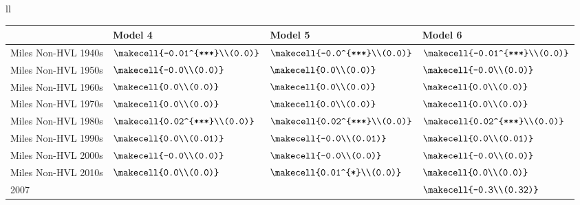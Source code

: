 \begin{tabular}{ll}
\begin{tabular}{llll}
\toprule
{} &                           Model 4 &                          Model 5 &                           Model 6 \\
\midrule
Miles Non-HVL 1940s &   $\makecell{-0.01^{***}\\(0.0)}$ &   $\makecell{-0.0^{***}\\(0.0)}$ &   $\makecell{-0.01^{***}\\(0.0)}$ \\
Miles Non-HVL 1950s &          $\makecell{-0.0\\(0.0)}$ &          $\makecell{0.0\\(0.0)}$ &          $\makecell{-0.0\\(0.0)}$ \\
Miles Non-HVL 1960s &           $\makecell{0.0\\(0.0)}$ &          $\makecell{0.0\\(0.0)}$ &           $\makecell{0.0\\(0.0)}$ \\
Miles Non-HVL 1970s &           $\makecell{0.0\\(0.0)}$ &          $\makecell{0.0\\(0.0)}$ &           $\makecell{0.0\\(0.0)}$ \\
Miles Non-HVL 1980s &    $\makecell{0.02^{***}\\(0.0)}$ &   $\makecell{0.02^{***}\\(0.0)}$ &    $\makecell{0.02^{***}\\(0.0)}$ \\
Miles Non-HVL 1990s &          $\makecell{0.0\\(0.01)}$ &        $\makecell{-0.0\\(0.01)}$ &          $\makecell{0.0\\(0.01)}$ \\
Miles Non-HVL 2000s &          $\makecell{-0.0\\(0.0)}$ &         $\makecell{-0.0\\(0.0)}$ &          $\makecell{-0.0\\(0.0)}$ \\
Miles Non-HVL 2010s &           $\makecell{0.0\\(0.0)}$ &     $\makecell{0.01^{*}\\(0.0)}$ &           $\makecell{0.0\\(0.0)}$ \\
2007                &                                   &                                  &         $\makecell{-0.3\\(0.32)}$ \\

\end{tabular}
\end{tabular}
